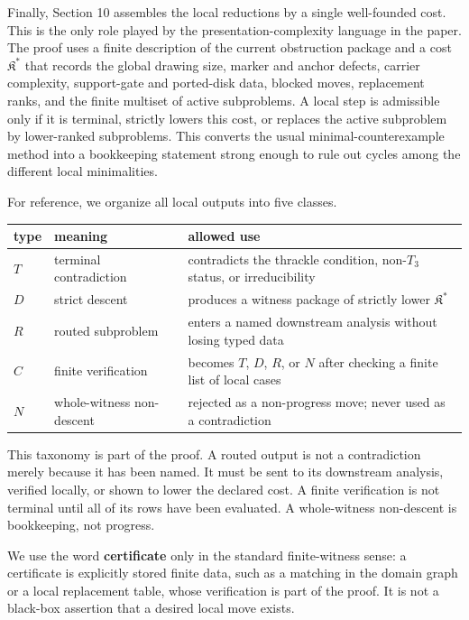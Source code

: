 \documentclass[11pt]{amsart}
\theoremstyle{definition}
\begin{document}
Finally, Section 10 assembles the local reductions by a single
well-founded cost. This is the only role played by the presentation-complexity
language in the paper. The proof uses a finite description of the current
obstruction package and a cost \(\mathfrak K^\ast\) that records the global
drawing size, marker and anchor defects, carrier complexity, support-gate and
ported-disk data, blocked moves, replacement ranks, and the finite multiset of
active subproblems. A local step is admissible only if it is terminal, strictly
lowers this cost, or replaces the active subproblem by lower-ranked subproblems.
This converts the usual minimal-counterexample method into a bookkeeping
statement strong enough to rule out cycles among the different local
minimalities.

For reference, we organize all local outputs into five classes.

\begin{center}
\begin{tabular}{p{}p{}p{}}
type & meaning & allowed use \\ \hline
\(T\) & terminal contradiction & contradicts the thrackle condition, non-\(T_3\) status, or irreducibility \\
\(D\) & strict descent & produces a witness package of strictly lower \(\mathfrak K^\ast\) \\
\(R\) & routed subproblem & enters a named downstream analysis without losing typed data \\
\(C\) & finite verification & becomes \(T\), \(D\), \(R\), or \(N\) after checking a finite list of local cases \\
\(N\) & whole-witness non-descent & rejected as a non-progress move; never used as a contradiction \\
\end{tabular}
\end{center}

This taxonomy is part of the proof. A routed output is not a contradiction
merely because it has been named. It must be sent to its downstream analysis,
verified locally, or shown to lower the declared cost. A finite verification is
not terminal until all of its rows have been evaluated. A whole-witness
non-descent is bookkeeping, not progress.

We use the word \textbf{certificate} only in the standard finite-witness sense: a
certificate is explicitly stored finite data, such as a matching in the domain
graph or a local replacement table, whose verification is part of the proof. It
is not a black-box assertion that a desired local move exists.
\end{document}

